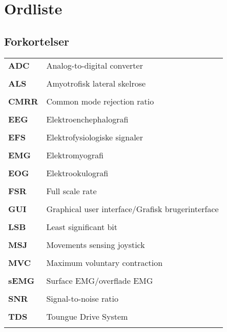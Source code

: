 \chapter*{Ordliste} \label{ordliste}
\vspace{-.75cm}
\section*{Forkortelser}
\vspace{0.75cm}
\begin{longtable}{p{}  p{}}

\textbf{ADC} & Analog-to-digital converter
\\ \\
\textbf{ALS} & Amyotrofisk lateral skelrose
\\ \\
\textbf{CMRR}  & Common mode rejection ratio     
\\ \\
\textbf{EEG}  & Elektroenchephalografi     
\\ \\
\textbf{EFS} & Elektrofysiologiske signaler 
\\ \\
\textbf{EMG} & Elektromyografi
\\ \\
\textbf{EOG}  & Elektrookulografi 
\\ \\
\textbf{FSR}  & Full scale rate 
\\ \\
\textbf{GUI}  & Graphical user interface/Grafisk brugerinterface
\\ \\
\textbf{LSB}  & Least significant bit 
\\ \\
\textbf{MSJ} & Movements sensing joystick
\\ \\
\textbf{MVC} & Maximum voluntary contraction
\\ \\
\textbf{sEMG} & Surface EMG/overflade EMG
\\ \\
\textbf{SNR} & Signal-to-noise ratio
\\ \\
\textbf{TDS} & Toungue Drive System  
\\ \\
\end{longtable}
